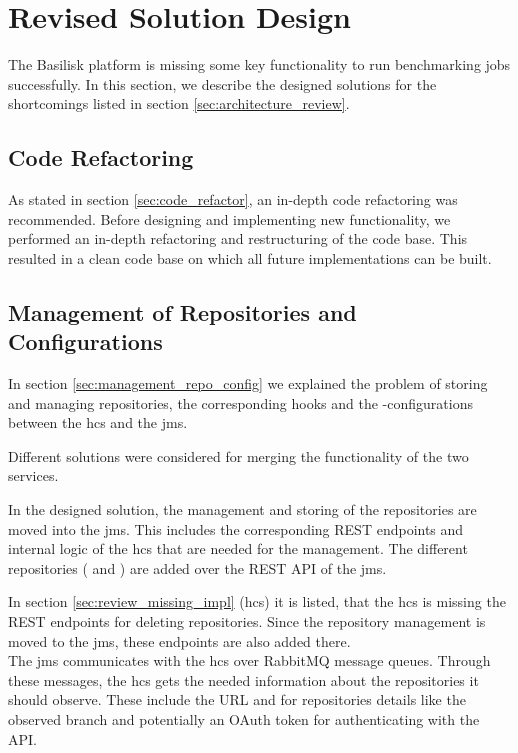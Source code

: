 \section{Revised Solution Design}
\label{sec:revised_solution_design}

The Basilisk platform is missing some key functionality to run benchmarking jobs successfully.
In this section, we describe the designed solutions for the shortcomings listed in section \ref{sec:architecture_review}.


\subsection{Code Refactoring}
\label{sec:impl_code_refactor}
As stated in section \ref{sec:code_refactor}, an in-depth code refactoring was recommended.
Before designing and implementing new functionality, we performed an in-depth refactoring and restructuring of the code base.
This resulted in a clean code base on which all future implementations can be built.


\subsection{Management of Repositories and Configurations}
\label{sec:management_repo_config_design}
In section \ref{sec:management_repo_config} we explained the problem of storing and managing repositories, the corresponding hooks and the \ts{}-configurations between the \acf{hcs} and the \acf{jms}.

Different solutions were considered for merging the functionality of the two services.

In the designed solution, the management and storing of the repositories are moved into the \ac{jms}.
This includes the corresponding REST endpoints and internal logic of the \ac{hcs} that are needed for the management.
The different repositories (\gh{} and \dockh{}) are added over the REST API of the \ac{jms}.

In section \ref{sec:review_missing_impl} (\acl{hcs}) it is listed, that the \ac{hcs} is missing the REST endpoints for deleting repositories.
Since the repository management is moved to the \ac{jms}, these endpoints are also added there.
\\

The \ac{jms} communicates with the \ac{hcs} over RabbitMQ message queues.
Through these messages, the \ac{hcs} gets the needed information about the repositories it should observe.
These include the URL and for \gh{} repositories details like the observed branch and potentially an OAuth token for authenticating with the API.

